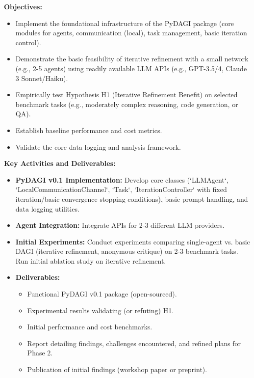 \documentclass[12pt]{amsart}
\begin{document}
\textbf{Objectives:}
\begin{itemize}[leftmargin=*]
    \item Implement the foundational infrastructure of the PyDAGI package (core modules for agents, communication (local), task management, basic iteration control).
    \item Demonstrate the basic feasibility of iterative refinement with a small network (e.g., 2-5 agents) using readily available LLM APIs (e.g., GPT-3.5/4, Claude 3 Sonnet/Haiku).
    \item Empirically test Hypothesis H1 (Iterative Refinement Benefit) on selected benchmark tasks (e.g., moderately complex reasoning, code generation, or QA).
    \item Establish baseline performance and cost metrics.
    \item Validate the core data logging and analysis framework.
\end{itemize}
\textbf{Key Activities and Deliverables:}
\begin{itemize}[leftmargin=*]
    \item \textbf{PyDAGI v0.1 Implementation:} Develop core classes (`LLMAgent`, `LocalCommunicationChannel`, `Task`, `IterationController` with fixed iteration/basic convergence stopping conditions), basic prompt handling, and data logging utilities.
    \item \textbf{Agent Integration:} Integrate APIs for 2-3 different LLM providers.
    \item \textbf{Initial Experiments:} Conduct experiments comparing single-agent vs. basic DAGI (iterative refinement, anonymous critique) on 2-3 benchmark tasks. Run initial ablation study on iterative refinement.
    \item \textbf{Deliverables:}
        \begin{itemize}
            \item Functional PyDAGI v0.1 package (open-sourced).
            \item Experimental results validating (or refuting) H1.
            \item Initial performance and cost benchmarks.
            \item Report detailing findings, challenges encountered, and refined plans for Phase 2.
            \item Publication of initial findings (workshop paper or preprint).
        \end{itemize}
\end{itemize}
\end{document}
